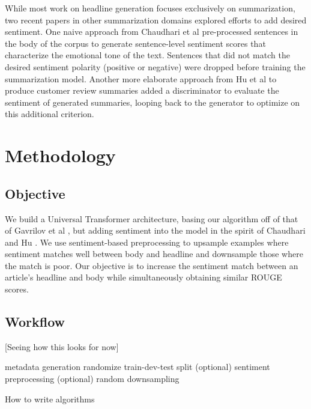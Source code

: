 \documentclass[11pt]{article}
\begin{document}
While most work on headline generation focuses exclusively on summarization, two recent papers in other summarization domains explored efforts to add desired sentiment. One naive approach from Chaudhari et al \cite{DBLP:journals/corr/abs-1802-09426} pre-processed sentences in the body of the corpus to generate sentence-level sentiment scores that characterize the emotional tone of the text. Sentences that did not match the desired sentiment polarity (positive or negative) were dropped before training the summarization model. Another more elaborate approach from Hu et al \cite{DBLP:journals/corr/HuYLSX17} to produce customer review summaries added a discriminator to evaluate the sentiment of generated summaries, looping back to the generator to optimize on this additional criterion. 

\section{Methodology}

\subsection{Objective}
We build a Universal Transformer architecture, basing our algorithm off of that of Gavrilov et al \cite{DBLP:journals/corr/abs-1901-07786}, but adding sentiment into the model in the spirit of Chaudhari   \cite{DBLP:journals/corr/abs-1802-09426} and Hu \cite{DBLP:journals/corr/HuYLSX17}. We use sentiment-based preprocessing to upsample examples where sentiment matches well between body and headline and downsample those where the match is poor. Our objective is to increase the sentiment match between an article's headline and body while simultaneously obtaining similar ROUGE scores.

\subsection{Workflow}
[Seeing how this looks for now]

\begin{algorithm}[H]
\SetAlgoLined
{}
 metadata generation\;
 randomize train-dev-test split\;
 (optional) sentiment preprocessing\;
 (optional) random downsampling\;
 \caption{How to write algorithms}
\end{algorithm}
\end{document}
